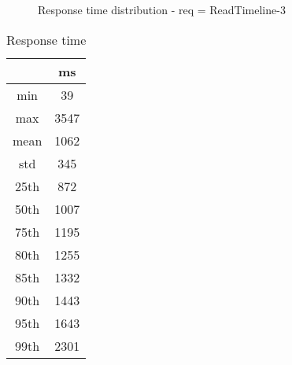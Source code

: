 \begin{minipage}{0.75\linewidth}
\begin{figure}[h]
\begin{adjustbox}{max width=1.0\linewidth, keepaspectratio}
  \end{adjustbox}
  \caption{Response time distribution - req = ReadTimeline-3}
\end{figure}
\end{minipage}\hfill\begin{minipage}{0.18\linewidth}
\begin{table}[h]
\begin{tabular}{|cc|}
\hline
\textbf{} & \textbf{ms}\\ \hline
 \Xhline{0.005\arrayrulewidth}
min & 39\\
 \Xhline{0.005\arrayrulewidth}
max & 3547\\
 \Xhline{0.005\arrayrulewidth}
mean & 1062\\
 \Xhline{0.005\arrayrulewidth}
std & 345\\
\hline
\hline
 \Xhline{0.005\arrayrulewidth}
25th & 872\\
 \Xhline{0.005\arrayrulewidth}
50th & 1007\\
 \Xhline{0.005\arrayrulewidth}
75th & 1195\\
 \Xhline{0.005\arrayrulewidth}
80th & 1255\\
 \Xhline{0.005\arrayrulewidth}
85th & 1332\\
 \Xhline{0.005\arrayrulewidth}
90th & 1443\\
 \Xhline{0.005\arrayrulewidth}
95th & 1643\\
 \Xhline{0.005\arrayrulewidth}
99th & 2301\\
\hline
\end{tabular}
\caption{Response time}
\end{table}
\end{minipage}\hfill